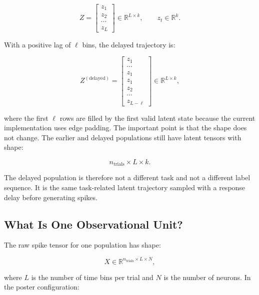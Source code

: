 \documentclass[11pt]{article}
\begin{document}
\begin{equation}
Z =
\begin{bmatrix}
z_1 \\
z_2 \\
\cdots \\
z_L
\end{bmatrix}
\in
\mathbb{R}^{L \times k},
\qquad
z_t \in \mathbb{R}^{k}.
\end{equation}

With a positive lag of $\ell$ bins, the delayed trajectory is:

\begin{equation}
Z^{(\text{delayed})}
=
\begin{bmatrix}
z_1 \\
\cdots \\
z_1 \\
z_1 \\
z_2 \\
\cdots \\
z_{L-\ell}
\end{bmatrix}
\in
\mathbb{R}^{L \times k},
\end{equation}

where the first $\ell$ rows are filled by the first valid latent state because
the current implementation uses edge padding. The important point is that the
shape does not change. The earlier and delayed populations still have latent
tensors with shape:

\begin{equation}
n_{\text{trials}} \times L \times k.
\end{equation}

The delayed population is therefore not a different task and not a different
label sequence. It is the same task-related latent trajectory sampled with a
response delay before generating spikes.

\subsection{What Is One Observational Unit?}

The raw spike tensor for one population has shape:

\begin{equation}
X \in \mathbb{R}^{n_{\text{trials}} \times L \times N},
\end{equation}

where $L$ is the number of time bins per trial and $N$ is the number of
neurons. In the poster configuration:
\end{document}

